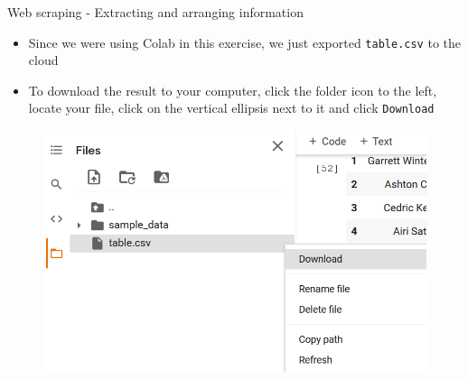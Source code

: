 \documentclass[aspectratio=169]{beamer}
\begin{document}
\begin{frame}{Web scraping - Extracting and arranging information}

	\begin{itemize}
		\item Since we were using Colab in this exercise, we just exported \texttt{table.csv} to the cloud
		\item To download the result to your computer, click the folder icon to the left, locate your file, click on the vertical ellipsis next to it and click \texttt{Download}
	\end{itemize}

	\begin{figure}
		\centering
		\includegraphics[width=0.5\linewidth]{img/colab_download.png}
	\end{figure}

\end{frame}
\end{document}
